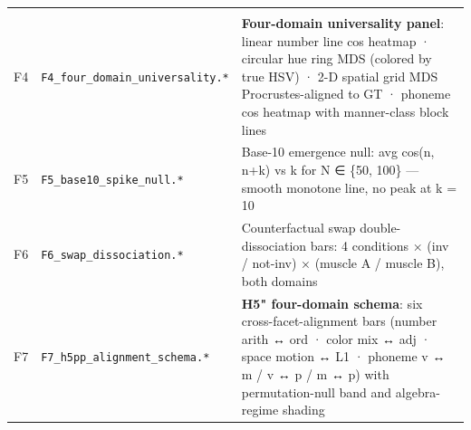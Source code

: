\begin{longtable}[]{@{}lll@{}}
\begin{minipage}[t]{0.30\columnwidth}
\end{minipage}\tabularnewline
\begin{minipage}[t]{0.30\columnwidth}\raggedright
F4\strut
\end{minipage} & \begin{minipage}[t]{0.30\columnwidth}\raggedright
\texttt{F4\_four\_domain\_universality.*}\strut
\end{minipage} & \begin{minipage}[t]{0.30\columnwidth}\raggedright
\textbf{Four-domain universality panel}: linear number line cos heatmap · circular hue ring MDS (colored by true HSV) · 2-D spatial grid MDS Procrustes-aligned to GT · phoneme cos heatmap with manner-class block lines\strut
\end{minipage}\tabularnewline
\begin{minipage}[t]{0.30\columnwidth}\raggedright
F5\strut
\end{minipage} & \begin{minipage}[t]{0.30\columnwidth}\raggedright
\texttt{F5\_base10\_spike\_null.*}\strut
\end{minipage} & \begin{minipage}[t]{0.30\columnwidth}\raggedright
Base-10 emergence null: avg cos(n, n+k) vs k for N ∈ \{50, 100\} --- smooth monotone line, no peak at k = 10\strut
\end{minipage}\tabularnewline
\begin{minipage}[t]{0.30\columnwidth}\raggedright
F6\strut
\end{minipage} & \begin{minipage}[t]{0.30\columnwidth}\raggedright
\texttt{F6\_swap\_dissociation.*}\strut
\end{minipage} & \begin{minipage}[t]{0.30\columnwidth}\raggedright
Counterfactual swap double-dissociation bars: 4 conditions × (inv / not-inv) × (muscle A / muscle B), both domains\strut
\end{minipage}\tabularnewline
\begin{minipage}[t]{0.30\columnwidth}\raggedright
F7\strut
\end{minipage} & \begin{minipage}[t]{0.30\columnwidth}\raggedright
\texttt{F7\_h5pp\_alignment\_schema.*}\strut
\end{minipage} & \begin{minipage}[t]{0.30\columnwidth}\raggedright
\textbf{H5" four-domain schema}: six cross-facet-alignment bars (number arith ↔ ord · color mix ↔ adj · space motion ↔ L1 · phoneme v ↔ m / v ↔ p / m ↔ p) with permutation-null band and algebra-regime shading\strut

\end{minipage}
\end{longtable}
